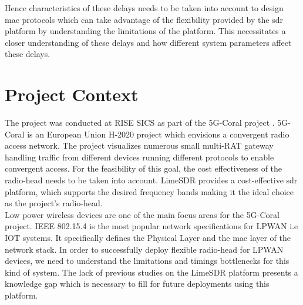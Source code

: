 Hence characteristics of these delays needs to be taken into account to design \ac{mac} protocols which can take advantage of the flexibility provided by the \ac{sdr} platform by understanding the limitations of the platform.
This necessitates a closer understanding of these delays and how different system parameters affect these delays.


\section{Project Context}

The project was conducted at RISE SICS as part of the 5G-Coral project \cite{noauthor_5g-coral_nodate}.
5G-Coral is an European Union H-2020 project which envisions a convergent radio access network.
The project visualizes numerous small multi-\ac{RAT} gateway handling traffic from different devices running different protocols to enable convergent access.
For the feasibility of this goal, the cost effectiveness of the radio-head needs to be taken into account.
LimeSDR \cite{noauthor_limesdr_nodate} provides a cost-effective \ac{sdr} platform, which supports the desired frequency bands making it the ideal choice as the project's radio-head.\\

Low power wireless devices are one of the main focus areas for the 5G-Coral project.
IEEE 802.15.4 is the most popular network specifications for \ac{LPWAN} i.e \ac{IOT} systems.
It specifically defines the Physical Layer and the \ac{mac} layer of the network stack.
In order to successfully deploy flexible radio-head for \ac{LPWAN} devices, we need to understand the limitations and timings bottlenecks for this kind of system.
The lack of previous studies on the LimeSDR platform presents a knowledge gap which is necessary to fill for future deployments using this platform.

